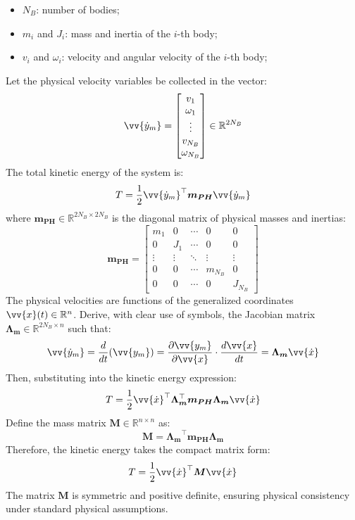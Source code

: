 \begin{itemize}
  \item \( N_B \): number of bodies;
  \item \( m_i \) and \( J_i \): mass and inertia of the \( i \)-th body;
  \item \( v_i \) and \( \omega_i\): velocity and angular velocity of the \( i \)-th body;
\end{itemize}

Let the physical velocity variables be collected in the vector:
\[
\vv{\dot{y}_m} =
\begin{bmatrix}
v_1 \\
\omega_1 \\
\vdots \\
v_{N_B} \\
\omega_{N_B}
\end{bmatrix}
\in \mathbb{R}^{2N_B}
\]
The total kinetic energy of the system is:
\[
T = \frac{1}{2} \vv{\dot{y}_m}^\top \boldsymbol{m_{PH}} \vv{\dot{y}_m}
\]
where \( \boldsymbol{m_{PH}} \in \mathbb{R}^{2N_B \times 2N_B} \) is the diagonal matrix of physical masses and inertias:
\[
\boldsymbol{m_{PH}} =
\begin{bmatrix}
m_1   & 0     & \cdots  & 0    & 0     \\
0    & J_1    & \cdots  & 0    & 0     \\
\vdots & \vdots  & \ddots  & \vdots  & \vdots  \\
0    & 0    & \cdots  & m_{N_B}  & 0     \\
0    & 0    & \cdots  & 0     & J_{N_B}
\end{bmatrix}
\]
The physical velocities are functions of the generalized coordinates \( \vv{x}(t) \in \mathbb{R}^n \). Derive, with clear use of symbols, the Jacobian matrix \( \boldsymbol{\Lambda_m} \in \mathbb{R}^{2N_B \times n} \) such that:
\[
\vv{\dot{y}_m} = \frac{d}{dt}(\vv{y_m}) = \frac{\partial \vv{y_m}}{\partial \vv{x}} \cdot \frac{d \vv{x}}{dt} = \boldsymbol{\Lambda_m} \vv{\dot{x}}
\]
Then, substituting into the kinetic energy expression:
\[
T = \frac{1}{2} \vv{\dot{x}}^\top \boldsymbol{\Lambda_m}^\top \boldsymbol{m_{PH}} \boldsymbol{\Lambda_m} \vv{\dot{x}}
\]
Define the mass matrix \( \boldsymbol{M} \in \mathbb{R}^{n \times n} \) as:
\[
\boldsymbol{M} = \boldsymbol{\Lambda_m}^\top \boldsymbol{m_{PH}} \boldsymbol{\Lambda_m}
\]
Therefore, the kinetic energy takes the compact matrix form:
\[
T = \frac{1}{2} \vv{\dot{x}}^\top \boldsymbol{M} \vv{\dot{x}}
\]
The matrix \( \boldsymbol{M} \) is symmetric and positive definite, ensuring physical consistency under standard physical assumptions.

